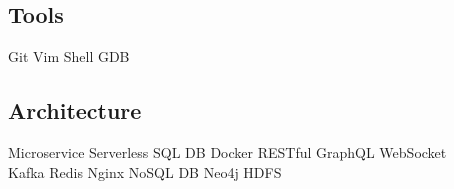 \documentclass[]{deedy-resume-openfont}
\begin{document}
\begin{minipage}[t]{0.25\textwidth}
\subsection{Tools}
Git \textbullet{} Vim \textbullet{} Shell \textbullet{} GDB \\
\sectionsep

\subsection{Architecture}
Microservice \textbullet{} Serverless \textbullet{} SQL DB
\textbullet{} Docker \textbullet{} RESTful \textbullet{}
GraphQL \textbullet WebSocket \\
Kafka \textbullet{} Redis \textbullet{} Nginx \textbullet NoSQL DB \textbullet{} Neo4j \textbullet HDFS
\sectionsep

%
%

\end{minipage} 
\hfill
\end{document}

